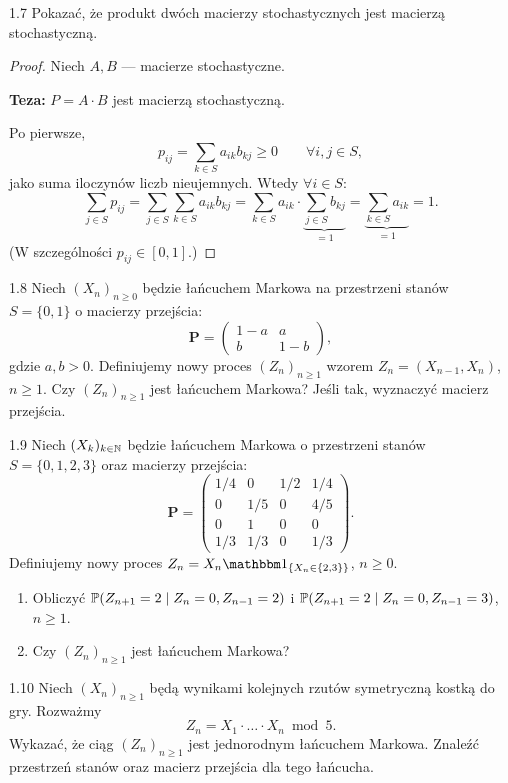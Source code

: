 \documentclass[dvipsnames]{book}
\begin{document}
\begin{zadanie}{1.7}
Pokazać, że produkt dwóch macierzy stochastycznych jest macierzą stochastyczną.
\end{zadanie}

\begin{proof}
Niech $A, B$ --- macierze stochastyczne.

\textbf{Teza:} $P = A \cdot B$ jest macierzą stochastyczną.

Po pierwsze,
\[
  p_{ij} = \sum_{k \in S} a_{ik} b_{kj} \geq 0 \qquad \forall i,j \in S,
\]
jako suma iloczynów liczb nieujemnych. Wtedy $\forall i \in S$:
\[
  \sum_{j \in S} p_{ij}
  = \sum_{j \in S} \sum_{k \in S} a_{ik} b_{kj}
  = \sum_{k \in S} a_{ik} \cdot \underbrace{\sum_{j \in S} b_{kj}}_{= 1}
  = \underbrace{\sum_{k \in S} a_{ik}}_{= 1} = 1.
\]
(W szczególności $p_{ij} \in [0,1]$.)
\end{proof}

\begin{zadanie}{1.8}
Niech $(X_n)_{n \geq 0}$ będzie łańcuchem Markowa na przestrzeni stanów
$S = \{0,1\}$ o macierzy przejścia:
\[
  \mathbf{P} =
  \begin{pmatrix}
    1-a & a \\
    b   & 1-b
  \end{pmatrix},
\]
gdzie $a, b > 0$. Definiujemy nowy proces $(Z_n)_{n \geq 1}$ wzorem
$Z_n = (X_{n-1}, X_n)$, $n \geq 1$. Czy $(Z_n)_{n \geq 1}$ jest łańcuchem
Markowa? Jeśli tak, wyznaczyć macierz przejścia.
\end{zadanie}

\begin{zadanie}{1.9}
Niech $(X_k)_{k \in \N}$ będzie łańcuchem Markowa o przestrzeni stanów
$S = \{0,1,2,3\}$ oraz macierzy przejścia:
\[
  \mathbf{P} =
  \begin{pmatrix}
    1/4 & 0   & 1/2 & 1/4 \\
    0   & 1/5 & 0   & 4/5 \\
    0   & 1   & 0   & 0   \\
    1/3 & 1/3 & 0   & 1/3
  \end{pmatrix}.
\]
Definiujemy nowy proces $Z_n = X_n \ind_{\{X_n \in \{2,3\}\}}$, $n \geq 0$.
\begin{enumerate}
  \item Obliczyć $\P(Z_{n+1} = 2 \mid Z_n = 0, Z_{n-1} = 2)$ i
  $\P(Z_{n+1} = 2 \mid Z_n = 0, Z_{n-1} = 3)$, $n \geq 1$.
  \item Czy $(Z_n)_{n \geq 1}$ jest łańcuchem Markowa?
\end{enumerate}
\end{zadanie}

\begin{zadanie}{1.10}
Niech $(X_n)_{n \geq 1}$ będą wynikami kolejnych rzutów symetryczną kostką do
gry. Rozważmy
\[
  Z_n = X_1 \cdot \ldots \cdot X_n \bmod 5.
\]
Wykazać, że ciąg $(Z_n)_{n \geq 1}$ jest jednorodnym łańcuchem Markowa. Znaleźć
przestrzeń stanów oraz macierz przejścia dla tego łańcucha.
\end{zadanie}
\end{document}
